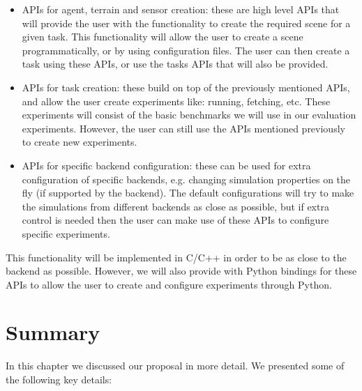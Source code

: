 \begin{itemize}
    \item APIs for agent, terrain and sensor creation: these are high level APIs 
          that will provide the user with the functionality to create the required
          scene for a given task. This functionality will allow the user to create
          a scene programmatically, or by using configuration files. The user can then
          create a task using these APIs, or use the tasks APIs that will also be provided.
    \item APIs for task creation: these build on top of the previously mentioned APIs,
          and allow the user create experiments like: running, fetching, etc. These
          experiments will consist of the basic benchmarks we will use in our evaluation
          experiments. However, the user can still use the APIs mentioned previously to
          create new experiments.
    \item APIs for specific backend configuration: these can be used for extra configuration
          of specific backends, e.g. changing simulation properties on the fly (if supported
          by the backend). The default configurations will try to make the simulations from different
          backends as close as possible, but if extra control is needed then the user can make
          use of these APIs to configure specific experiments.
\end{itemize}

This functionality will be implemented in C/C++ in order to be as close to the backend as possible.
However, we will also provide with Python bindings for these APIs to allow the user to create and 
configure experiments through Python.

\newpage

\section{Summary}

In this chapter we discussed our proposal in more detail. We presented some of
the following key details:

